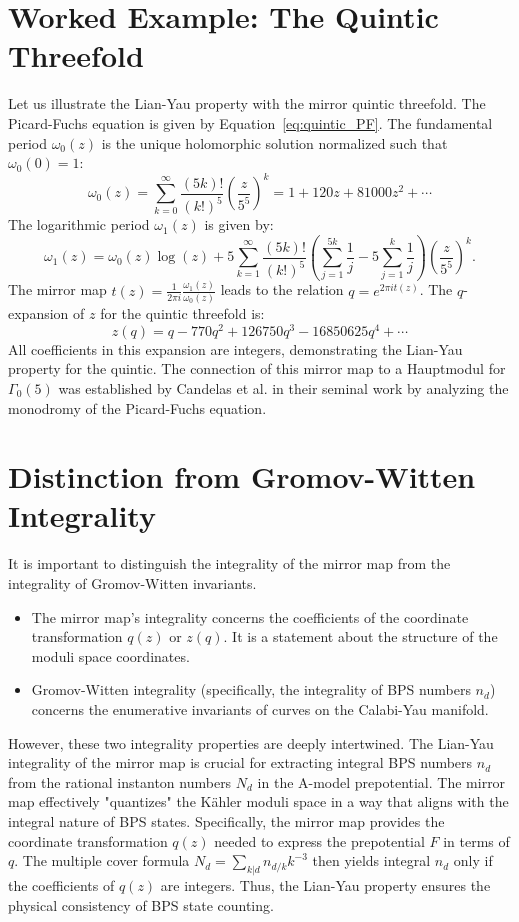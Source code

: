 \documentclass{book}
\newcommand{\omegaf}{\omega_0} %
\newcommand{\omegal}{\omega_1} %
\newcommand{\qexp}{q} %
\newcommand{\zmod}{z} %
\newcommand{\tmap}{t} %
\newcommand{\Fgen}{F} %
\newcommand{\Nd}{N_d} %
\newcommand{\nd}{n_d} %
\theoremstyle{definition}
\begin{document}
\section{Worked Example: The Quintic Threefold}
Let us illustrate the Lian-Yau property with the mirror quintic threefold.
The Picard-Fuchs equation is given by Equation~\eqref{eq:quintic_PF}.
The fundamental period $\omegaf(\zmod)$ is the unique holomorphic solution normalized such that $\omegaf(0)=1$:
\[
\omegaf(\zmod) = \sum_{k=0}^\infty \frac{(5k)!}{(k!)^5} \left(\frac{\zmod}{5^5}\right)^k = 1 + 120 \zmod + 81000 \zmod^2 + \cdots
\]
The logarithmic period $\omegal(\zmod)$ is given by:
\[
\omegal(\zmod) = \omegaf(\zmod) \log(\zmod) + 5 \sum_{k=1}^\infty \frac{(5k)!}{(k!)^5} \left(\sum_{j=1}^{5k} \frac{1}{j} - 5 \sum_{j=1}^k \frac{1}{j}\right) \left(\frac{\zmod}{5^5}\right)^k.
\]
The mirror map $\tmap(\zmod) = \frac{1}{2\pi i} \frac{\omegal(\zmod)}{\omegaf(\zmod)}$ leads to the relation $\qexp = e^{2\pi i \tmap(\zmod)}$.
The $\qexp$-expansion of $\zmod$ for the quintic threefold is:
\[
\zmod(\qexp) = \qexp - 770 \qexp^2 + 126750 \qexp^3 - 16850625 \qexp^4 + \cdots
\]
All coefficients in this expansion are integers, demonstrating the Lian-Yau property for the quintic. The connection of this mirror map to a Hauptmodul for $\Gamma_0(5)$ was established by Candelas et al. in their seminal work \cite{Candelas1991} by analyzing the monodromy of the Picard-Fuchs equation.

\section{Distinction from Gromov-Witten Integrality}
It is important to distinguish the integrality of the mirror map from the integrality of Gromov-Witten invariants.
\begin{itemize}
    \item The mirror map's integrality concerns the coefficients of the coordinate transformation $\qexp(\zmod)$ or $\zmod(\qexp)$. It is a statement about the structure of the moduli space coordinates.
    \item Gromov-Witten integrality (specifically, the integrality of BPS numbers $\nd$) concerns the enumerative invariants of curves on the Calabi-Yau manifold.
\end{itemize}
However, these two integrality properties are deeply intertwined. The Lian-Yau integrality of the mirror map is crucial for extracting integral BPS numbers $\nd$ from the rational instanton numbers $\Nd$ in the A-model prepotential. The mirror map effectively "quantizes" the K\"ahler moduli space in a way that aligns with the integral nature of BPS states. Specifically, the mirror map provides the coordinate transformation $\qexp(\zmod)$ needed to express the prepotential $\Fgen$ in terms of $\qexp$. The multiple cover formula $\Nd = \sum_{k|d} n_{d/k} k^{-3}$ then yields integral $\nd$ only if the coefficients of $\qexp(\zmod)$ are integers. Thus, the Lian-Yau property ensures the physical consistency of BPS state counting.
\end{document}
